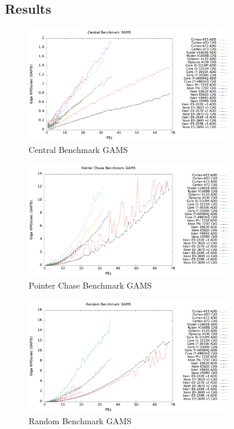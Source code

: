 
\subsection{Results}
\label{subsec:results}

\begin{figure}[!t]
\centering
\includegraphics[width=3.5in]{figures/CENTRAL_GAMS.png}
\caption{Central Benchmark GAMS}
\label{fig:central_gams}
\end{figure}

\begin{figure}[!t]
\centering
\includegraphics[width=3.5in]{figures/PTRCHASE_GAMS.png}
\caption{Pointer Chase Benchmark GAMS}
\label{fig:ptrchase_gams}
\end{figure}

\begin{figure}[!t]
\centering
\includegraphics[width=3.5in]{figures/RAND_GAMS.png}
\caption{Random Benchmark GAMS}
\label{fig:rand_gams}
\end{figure}

